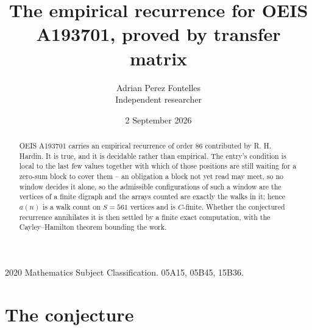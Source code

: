 \documentclass[11pt,a4paper]{article}
\title{The empirical recurrence for OEIS A193701, proved by transfer matrix}
\author{Adrian Perez Fontelles\\ \small Independent researcher}
\date{2 September 2026}
\theoremstyle{plain}
\theoremstyle{definition}
\begin{document}
\maketitle

\begin{abstract}
OEIS A193701 carries an empirical recurrence of order $86$ contributed by R. H. Hardin. It is
true, and it is decidable rather than empirical. The entry's condition is local to the last few values together with which of those positions are still waiting for a zero-sum block to cover them -- an obligation a block not yet read may meet, so no window decides it alone, so
the admissible configurations of such a window are the vertices of a finite digraph and the
arrays counted are exactly the walks in it; hence $a(n)$ is a walk count on $S=561$ vertices
and is $C$-finite. Whether the conjectured recurrence annihilates it is then settled by a
finite exact computation, with the Cayley--Hamilton theorem bounding the work.
\end{abstract}

\noindent\small 2020 Mathematics Subject Classification. 05A15, 05B45, 15B36.\normalsize

\section{The conjecture}
\end{document}
